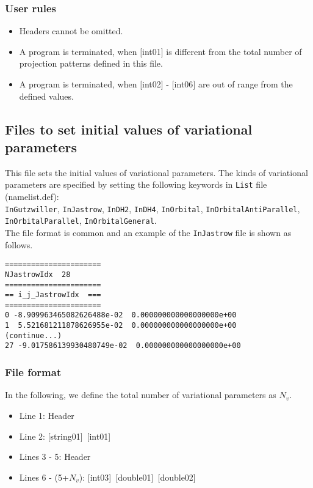 \subsubsection{User rules}
\begin{itemize}
\item Headers cannot be omitted. 
\item A program is terminated, when $[$int01$]$ is different from the total number of projection patterns defined in this file.
\item A program is terminated, when $[$int02$]$ - $[$int06$]$ are out of range from the defined values.
\end{itemize}

\newpage
\subsection{Files to set initial values of variational parameters}
\label{Subsec:InputParam}
This file sets the initial values of variational parameters.
The kinds of variational parameters are specified by setting the following keywords in \verb|List| file (namelist.def):\\
\verb|InGutzwiller|, \verb|InJastrow|, \verb|InDH2|, \verb|InDH4|, \verb|InOrbital|, \verb|InOrbitalAntiParallel|, \verb|InOrbitalParallel|, \verb|InOrbitalGeneral|.\\
The file format is common and an example of the \verb|InJastrow| file is shown as follows.

\begin{minipage}{12.5cm}
\begin{screen}
\begin{verbatim}
======================
NJastrowIdx  28
====================== 
== i_j_JastrowIdx  ===
====================== 
0 -8.909963465082626488e-02  0.000000000000000000e+00
1  5.521681211878626955e-02  0.000000000000000000e+00
(continue...)
27 -9.017586139930480749e-02  0.000000000000000000e+00
\end{verbatim}
\end{screen}
\end{minipage}

\subsubsection{File format}
In the following, we define the total number of variational parameters as $N_v$.
 \begin{itemize}
   \item  Line 1: Header
   \item  Line 2: [string01]~[int01]
   \item  Lines 3 - 5:  Header
   \item  Lines 6 - (5+$N_v$): [int03]~[double01]~[double02]
  \end{itemize}
